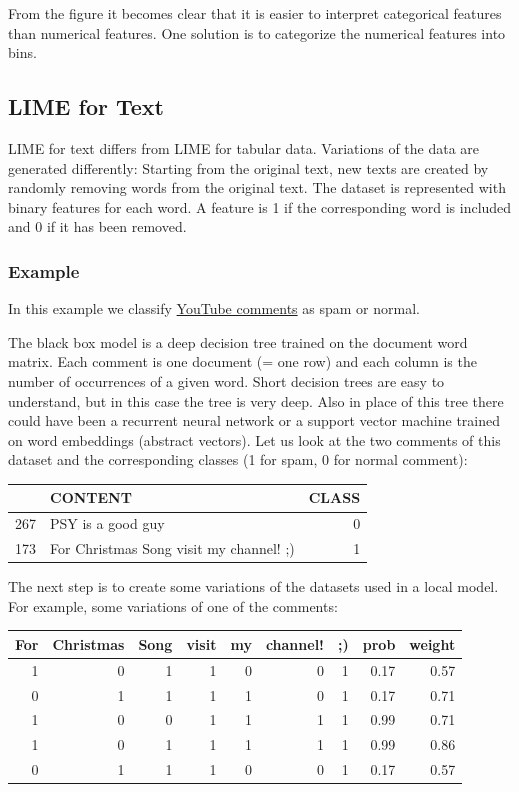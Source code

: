 \documentclass[
  11pt,
]{scrbook}
\begin{document}
From the figure it becomes clear that it is easier to interpret categorical features than numerical features.
One solution is to categorize the numerical features into bins.

\hypertarget{lime-for-text}{%
\subsection{LIME for Text}\label{lime-for-text}}

LIME for text differs from LIME for tabular data.
Variations of the data are generated differently:
Starting from the original text, new texts are created by randomly removing words from the original text.
The dataset is represented with binary features for each word.
A feature is 1 if the corresponding word is included and 0 if it has been removed.

\hypertarget{example-6}{%
\subsubsection{Example}\label{example-6}}

In this example we classify \protect\hyperlink{spam-data}{YouTube comments} as spam or normal.

The black box model is a deep decision tree trained on the document word matrix.
Each comment is one document (= one row) and each column is the number of occurrences of a given word.
Short decision trees are easy to understand, but in this case the tree is very deep.
Also in place of this tree there could have been a recurrent neural network or a support vector machine trained on word embeddings (abstract vectors).
Let us look at the two comments of this dataset and the corresponding classes (1 for spam, 0 for normal comment):

\begin{table}
\centering
\begin{tabular}{llr}
\toprule
  & CONTENT & CLASS\\
\midrule
267 & PSY is a good guy & 0\\
173 & For Christmas Song visit my channel! ;) & 1\\
\bottomrule
\end{tabular}
\end{table}

The next step is to create some variations of the datasets used in a local model.
For example, some variations of one of the comments:

\begin{table}
\centering
\begin{tabular}{rrrrrrrrr}
\toprule
For & Christmas & Song & visit & my & channel! & ;) & prob & weight\\
\midrule
1 & 0 & 1 & 1 & 0 & 0 & 1 & 0.17 & 0.57\\
0 & 1 & 1 & 1 & 1 & 0 & 1 & 0.17 & 0.71\\
1 & 0 & 0 & 1 & 1 & 1 & 1 & 0.99 & 0.71\\
1 & 0 & 1 & 1 & 1 & 1 & 1 & 0.99 & 0.86\\
0 & 1 & 1 & 1 & 0 & 0 & 1 & 0.17 & 0.57\\
\bottomrule
\end{tabular}
\end{table}
\end{document}
